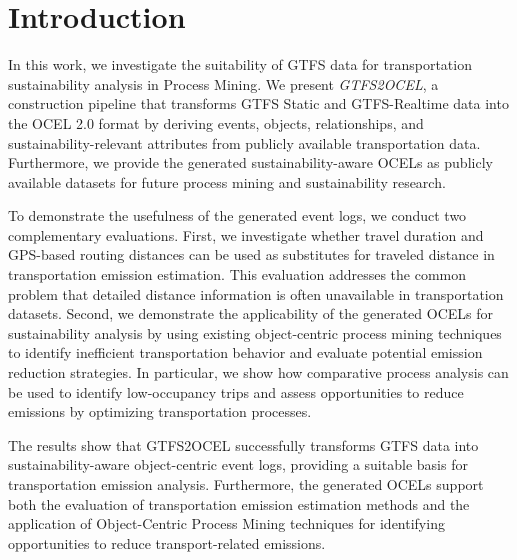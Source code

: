 \chapter{Introduction}
\label{chap:intro}
In this work, we investigate the suitability of GTFS data for transportation sustainability analysis in Process Mining. We present \textit{GTFS2OCEL}, a construction pipeline that transforms GTFS Static and GTFS-Realtime data into the OCEL 2.0 format by deriving events, objects, relationships, and sustainability-relevant attributes from publicly available transportation data. Furthermore, we provide the generated sustainability-aware OCELs as publicly available datasets for future process mining and sustainability research.

To demonstrate the usefulness of the generated event logs, we conduct two complementary evaluations. First, we investigate whether travel duration and GPS-based routing distances can be used as substitutes for traveled distance in transportation emission estimation. This evaluation addresses the common problem that detailed distance information is often unavailable in transportation datasets. Second, we demonstrate the applicability of the generated OCELs for sustainability analysis by using existing object-centric process mining techniques to identify inefficient transportation behavior and evaluate potential emission reduction strategies. In particular, we show how comparative process analysis can be used to identify low-occupancy trips and assess opportunities to reduce emissions by optimizing transportation processes.

The results show that GTFS2OCEL successfully transforms GTFS data into sustainability-aware object-centric event logs, providing a suitable basis for transportation emission analysis. Furthermore, the generated OCELs support both the evaluation of transportation emission estimation methods and the application of Object-Centric Process Mining techniques for identifying opportunities to reduce transport-related emissions.

